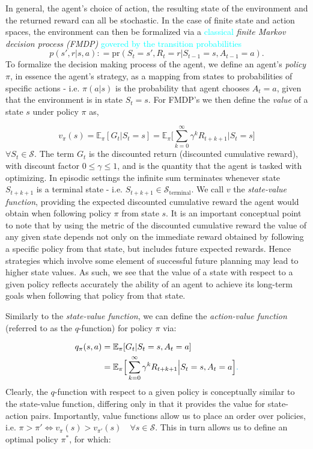 \documentclass[twocolumn,preprintnumbers,amsmath,amssymb,notitlepage,nofootinbib,longbibliography,superscriptaddress,aps,pra,10pt]{revtex4-1}
\newcommand{\defeq}{\mathrel{\mathop:}=}
\newcommand{\je}[1]{\textcolor{cyan}{#1}}
\begin{document}
	In general, the agent's choice of action, the resulting state of the environment and the returned reward can all be stochastic. In the case of finite state and action spaces, the environment can then be formalized via a  \je{classical}  \emph{finite Markov decision process (FMDP)} \je{govered by the transition probabilities}
	\begin{equation}
		p(s',r|s,a) \defeq \mathrm{pr}(S_t = s',R_t = r|S_{t-1} = s, A_{t-1} = a).
	\end{equation}
	To formalize the decision making process of the agent, we define an agent's \textit{policy} $\pi$, in essence the agent's strategy, as a mapping from states to probabilities of specific actions - i.e. $\pi(a|s)$ is the probability that agent chooses $A_t = a$, given that the environment is in state $S_t = s$.
	For FMDP's we then define the \textit{value} of a state $s$ under policy $\pi$ as,

	\begin{equation}
		v_{\pi}(s) = \mathbb{E}_{\pi}[G_t|S_t = s]  = \mathbb{E}_{\pi} \Big[\sum_{k = 0}^{\infty}\gamma^k R_{t+k+1}\Big| S_t = s \Big]
	\end{equation}
	$\forall S_t \in \mathcal{S}$.
	The term $G_t$ is the discounted return (discounted cumulative reward), with discount factor $0 \leq \gamma \leq 1$, and is the quantity that the agent is tasked with optimizing.
	In episodic settings the infinite sum terminates whenever state $S_{t+k+1}$ is a terminal state - i.e. $S_{t+k+1} \in \mathcal{S}_{\mathrm{terminal}}$.
	We call $v$ the \textit{state-value function}, providing the expected discounted cumulative reward the agent would obtain when following policy $\pi$ from state $s$.
	It is an important conceptual point to note that by using the metric of the discounted cumulative reward the value of any given state depends not only on the immediate reward obtained by following a specific policy from that state, but includes future expected rewards.
	Hence strategies which involve some element of successful future planning may lead to higher state values.
	As such, we see that the value of a state with respect to a given policy reflects accurately the ability of an agent to achieve its long-term goals when following that policy from that state.

	Similarly to the \textit{state-value function}, we can define the \textit{action-value function}  (referred to as the $q$-function) for policy $\pi$ via:

	\begin{align}
		q_{\pi}(s,a) &= \mathbb{E}_{\pi}[G_t|S_t = s, A_t = a]  \\
		& = \mathbb{E}_{\pi} \Big[\sum_{k = 0}^{\infty}\gamma^k R_{t+k+1}\Big| S_t = s, A_t = a \Big] \je{.}
	\end{align}
	Clearly, the $q$-function with respect to a given policy is conceptually similar to the state-value function, differing only in that it provides the value for state-action pairs.
	Importantly, value functions allow us to place an order over policies, i.e. $\pi > \pi' \iff v_{\pi}(s) > v_{\pi'}(s)\quad \forall s \in \mathcal{S} $.
	This in turn allows us to define an optimal policy $\pi^*$, for which:
\end{document}
